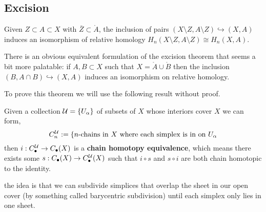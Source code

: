 \documentclass[a4paper]{article}
\begin{document}

\subsection{Excision}

\begin{theorem}[Excision]
    Given $Z\subset A \subset X$ with $\bar{Z}\subset \mathring{A}$, the inclusion of pairs $(X\setminus Z,A\setminus Z)\hookrightarrow (X,A)$ induces an isomorphism of relative homology $H_n(X\setminus Z,A\setminus Z)\cong H_n(X,A)$.
\end{theorem}
There is an obvious equivalent formulation of the excision theorem that seems a bit more palatable: if $A,B\subset X$ such that $X=\mathring{A}\cup\mathring{B}$ then the inclusion $(B,A\cap B)\hookrightarrow (X,A)$ induces an isomorphism on relative homology.

To prove this theorem we will use the following result without proof.
\begin{proposition}
    Given a collection $\mathcal{U}=\{U_\alpha\}$ of subsets of $X$ whose interiors cover $X$ we can form,\[
        C_n^{\mathcal{U}}:=\{\text{$n$-chains in  $X$ where each simplex is in on $U_\alpha$}
    \] then $i:C_\bullet^{\mathcal{U}}\rightarrow C_\bullet(X)$ is a \textbf{chain homotopy equivalence}, which means there exists some $s:C_\bullet(X)\rightarrow C_\bullet^{\mathcal{U}}(X)$ such that $i\circ s$ and $s\circ i$ are both chain homotopic to the identity.
\end{proposition}
the idea is that we can subdivide simplices that overlap the sheet in our open cover (by something called barycentric subdivision) until each simplex only lies in one sheet.
\end{document}

